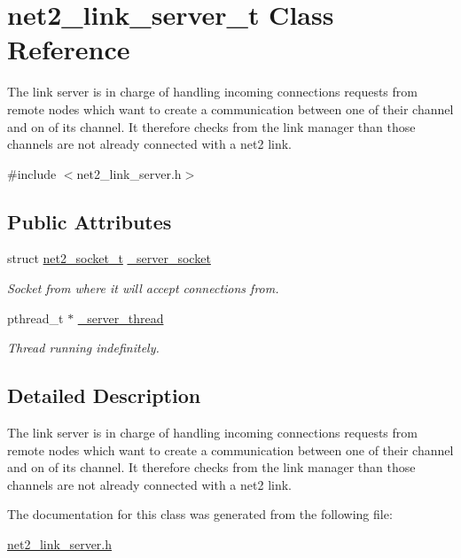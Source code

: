 \hypertarget{structnet2__link__server__t}{\section{net2\-\_\-link\-\_\-server\-\_\-t Class Reference}
\label{structnet2__link__server__t}
}


The link server is in charge of handling incoming connections requests from remote nodes which want to create a communication between one of their channel and on of its channel. It therefore checks from the link manager than those channels are not already connected with a net2 link.  




{\ttfamily \#include $<$net2\-\_\-link\-\_\-server.\-h$>$}

\subsection*{Public Attributes}
\begin{DoxyCompactItemize}
\item 
\hypertarget{structnet2__link__server__t_abcd4b2d9f1f25fc68d4100d1d897f11f}{struct \hyperlink{structnet2__socket__t}{net2\-\_\-socket\-\_\-t} \hyperlink{structnet2__link__server__t_abcd4b2d9f1f25fc68d4100d1d897f11f}{\-\_\-server\-\_\-socket}}\label{structnet2__link__server__t_abcd4b2d9f1f25fc68d4100d1d897f11f}

\begin{DoxyCompactList}\small\item\em Socket from where it will accept connections from. \end{DoxyCompactList}\item 
\hypertarget{structnet2__link__server__t_ade7ce485e3476cd2f003fd83c9226916}{pthread\-\_\-t $\ast$ \hyperlink{structnet2__link__server__t_ade7ce485e3476cd2f003fd83c9226916}{\-\_\-server\-\_\-thread}}\label{structnet2__link__server__t_ade7ce485e3476cd2f003fd83c9226916}

\begin{DoxyCompactList}\small\item\em Thread running indefinitely. \end{DoxyCompactList}\end{DoxyCompactItemize}


\subsection{Detailed Description}
The link server is in charge of handling incoming connections requests from remote nodes which want to create a communication between one of their channel and on of its channel. It therefore checks from the link manager than those channels are not already connected with a net2 link. 

The documentation for this class was generated from the following file\-:\begin{DoxyCompactItemize}
\item 
\hyperlink{net2__link__server_8h}{net2\-\_\-link\-\_\-server.\-h}\end{DoxyCompactItemize}
